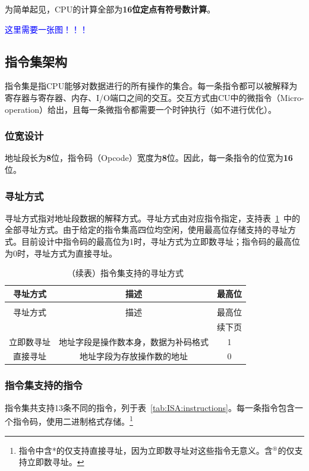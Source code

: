 \documentclass[lang=cn,a4paper,newtx]{elegantpaper}
\begin{document}
为简单起见，CPU的计算全部为\textbf{16位定点有符号数计算}。

\textcolor{blue}{这里需要一张图！！！}




\subsection{指令集架构}
指令集是指CPU能够对数据进行的所有操作的集合。每一条指令都可以被解释为寄存器与寄存器、内存、I/O端口之间的交互。交互方式由CU中的微指令（Micro-operation）给出，且每一条微指令都需要一个时钟执行（如不进行优化）。
\subsubsection{位宽设计}
地址段长为\textbf{8}位，指令码（Opcode）宽度为\textbf{8}位。因此，每一条指令的位宽为\textbf{16}位。
\subsubsection{寻址方式}
寻址方式指对地址段数据的解释方式。寻址方式由对应指令指定，支持表~\ref{tab:ISA:addressingmode}~中的全部寻址方式。由于给定的指令集高四位均空闲，使用最高位存储支持的寻址方式。目前设计中指令码的最高位为1时，寻址方式为立即数寻址；指令码的最高位为0时，寻址方式为直接寻址。
\begin{longtable}{c c c}
  \caption{指令集支持的寻址方式} \label{tab:ISA:addressingmode} \\
  \toprule
  寻址方式  & 描述 & 最高位\\
  \midrule
  \endfirsthead
  
  \caption[]{（续表）指令集支持的寻址方式} \\
  \toprule
  寻址方式  & 描述 & 最高位\\
  \midrule
  \endhead
  
  \midrule
  \multicolumn{3}{r}{续下页} \\
  \midrule
  \endfoot
  
  \bottomrule
  \endlastfoot
  
  立即数寻址   &  地址字段是操作数本身，数据为补码格式  & 1\\
  直接寻址 &  地址字段为存放操作数的地址    & 0\\
\end{longtable}

\subsubsection{指令集支持的指令}
指令集共支持13条不同的指令，列于表~\ref{tab:ISA:instructions}。每一条指令包含一个指令码，使用二进制格式存储。\footnote{指令中含*的仅支持直接寻址，因为立即数寻址对这些指令无意义。含$^\circledast$的仅支持立即数寻址。}
  
\end{document}
